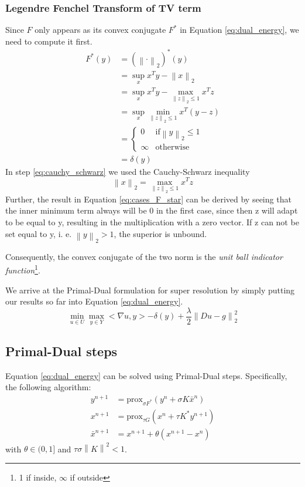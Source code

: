 \documentclass{paper}
\newcommand{\prox}{\text{prox}}
\newcommand{\norm}[1]{\left\lVert#1\right\rVert}
\newcommand{\twonorm}[1]{\left\lVert#1\right\rVert_2}
\begin{document}
\subsubsection*{Legendre Fenchel Transform of TV term}
Since $F$ only appears as its convex conjugate $F^*$ in Equation \eqref{eq:dual_energy}, we need to compute it first.
\begin{align}
	F^*(y) &= (\norm{\cdot}_2)^*(y) \\
		  &= \sup_x x^T y - \twonorm{x} \\
		  &= \sup_x x^T y - \max_{\twonorm{z} \leq 1} x^T z \label{eq:cauchy_schwarz}\\
		  &= \sup_x \min_{\twonorm{z} \leq 1} x^T(y-z) \\
		  &= \begin{cases}
   				0  			& \text{if} \twonorm{y} \leq 1 \\
   				\infty      & \text{otherwise}
  			 \end{cases} \label{eq:cases_F_star} \\
  	      &= \delta(y)
\end{align}
In step \eqref{eq:cauchy_schwarz} we used the Cauchy-Schwarz inequality
\begin{equation}
	\twonorm{x} = \max_{\twonorm{z} \leq 1} x^T z
\end{equation}
Further, the result in Equation \eqref{eq:cases_F_star} can be derived by seeing that 
the inner minimum term always will be 0 in the first case, since then z will adapt to be
equal to y, resulting in the multiplication with a zero vector. If z can not be set equal
to y, i. e. $\twonorm{y} > 1$, the superior is unbound.

Consequently, the convex conjugate of the two norm is the \emph{unit ball indicator function}\footnote{1 if inside, $\infty$ if outside}.

We arrive at the Primal-Dual formulation for super resolution by simply putting our
results so far into Equation \eqref{eq:dual_energy}.
\begin{equation}
\min_{u \in U} \max_{y \in Y} <\nabla u, y> - \delta(y) + \frac{\lambda}{2}\twonorm{Du - g}^2
\end{equation}

\subsection*{Primal-Dual steps}
Equation \eqref{eq:dual_energy} can be solved using Primal-Dual steps. Specifically,
the following algorithm:
\begin{align}
	y^{n+1} &= \prox_{\sigma F^*}(y^n + \sigma K \bar{x}^n) \label{eq:yn1} \\
	x^{n+1} &= \prox_{\tau G}(x^n + \tau K^* y^{n+1}) \label{eq:xn1} \\
	\bar{x}^{n+1} &= x^{n+1} + \theta(x^{n+1} - x^n) \label{ex:barxn1}
\end{align}
with $\theta \in (0, 1]$ and $\tau \sigma \norm{K}^2 < 1$. 
\end{document}
